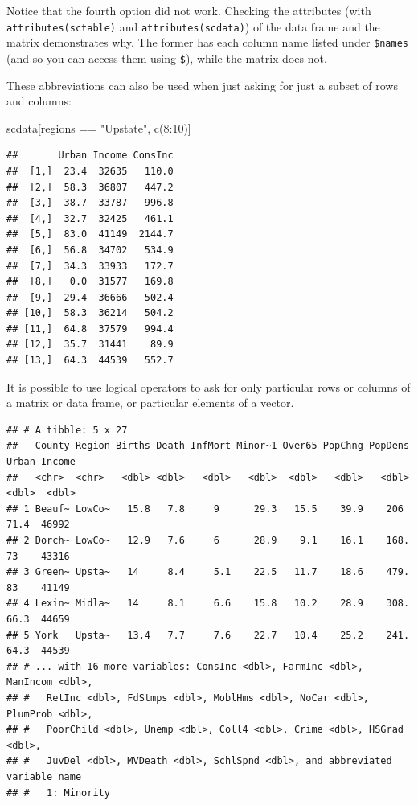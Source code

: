 \documentclass[
]{book}
\newenvironment{Shaded}{\begin{snugshade}}{\end{snugshade}}
\newcommand{\DecValTok}[1]{\textcolor[rgb]{0.00,0.00,0.81}{#1}}
\newcommand{\FunctionTok}[1]{\textcolor[rgb]{0.00,0.00,0.00}{#1}}
\newcommand{\NormalTok}[1]{#1}
\newcommand{\SpecialCharTok}[1]{\textcolor[rgb]{0.00,0.00,0.00}{#1}}
\newcommand{\StringTok}[1]{\textcolor[rgb]{0.31,0.60,0.02}{#1}}
\begin{document}
Notice that the fourth option did not work. Checking the attributes (with \texttt{attributes(sctable)} and \texttt{attributes(scdata)}) of the data frame and the matrix demonstrates why. The former has each column name listed under \texttt{\$names} (and so you can access them using \texttt{\$}), while the matrix does not.

These abbreviations can also be used when just asking for just a subset of rows and columns:

\begin{Shaded}
\begin{Highlighting}[]
\NormalTok{scdata[regions }\SpecialCharTok{==} \StringTok{"Upstate"}\NormalTok{, }\FunctionTok{c}\NormalTok{(}\DecValTok{8}\SpecialCharTok{:}\DecValTok{10}\NormalTok{)]}
\end{Highlighting}
\end{Shaded}

\begin{verbatim}
##       Urban Income ConsInc
##  [1,]  23.4  32635   110.0
##  [2,]  58.3  36807   447.2
##  [3,]  38.7  33787   996.8
##  [4,]  32.7  32425   461.1
##  [5,]  83.0  41149  2144.7
##  [6,]  56.8  34702   534.9
##  [7,]  34.3  33933   172.7
##  [8,]   0.0  31577   169.8
##  [9,]  29.4  36666   502.4
## [10,]  58.3  36214   504.2
## [11,]  64.8  37579   994.4
## [12,]  35.7  31441    89.9
## [13,]  64.3  44539   552.7
\end{verbatim}

It is possible to use logical operators to ask for only particular rows or columns of a matrix or data frame, or particular elements of a vector.

\begin{Shaded}
\end{Shaded}

\begin{verbatim}
## # A tibble: 5 x 27
##   County Region Births Death InfMort Minor~1 Over65 PopChng PopDens Urban Income
##   <chr>  <chr>   <dbl> <dbl>   <dbl>   <dbl>  <dbl>   <dbl>   <dbl> <dbl>  <dbl>
## 1 Beauf~ LowCo~   15.8   7.8     9      29.3   15.5    39.9    206   71.4  46992
## 2 Dorch~ LowCo~   12.9   7.6     6      28.9    9.1    16.1    168.  73    43316
## 3 Green~ Upsta~   14     8.4     5.1    22.5   11.7    18.6    479.  83    41149
## 4 Lexin~ Midla~   14     8.1     6.6    15.8   10.2    28.9    308.  66.3  44659
## 5 York   Upsta~   13.4   7.7     7.6    22.7   10.4    25.2    241.  64.3  44539
## # ... with 16 more variables: ConsInc <dbl>, FarmInc <dbl>, ManIncom <dbl>,
## #   RetInc <dbl>, FdStmps <dbl>, MoblHms <dbl>, NoCar <dbl>, PlumProb <dbl>,
## #   PoorChild <dbl>, Unemp <dbl>, Coll4 <dbl>, Crime <dbl>, HSGrad <dbl>,
## #   JuvDel <dbl>, MVDeath <dbl>, SchlSpnd <dbl>, and abbreviated variable name
## #   1: Minority
\end{verbatim}
\end{document}

